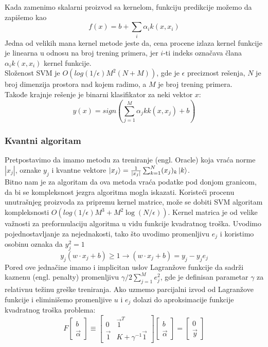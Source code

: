 \documentclass[12pt, letterpaper, oneside]{article}
\begin{document}
Kada zamenimo skalarni proizvod sa kernelom, funkciju predikcije možemo da zapišemo kao
\[
    f(x) = b + \sum_i \alpha_{i}k(x,x_i)
\]
Jedna od velikih mana kernel metode jeste da, cena procene izlaza kernel funkcije je linearna u odnosu na broj trening primera, jer $i$-ti indeks označava člana $\alpha_ik(x,x_i)$ kernel funkcije. \cite{goodfellow2016deep} \\
Složenost SVM je $O(log(1/\epsilon)M^2(N+M))$, gde je $\epsilon$ preciznost rešenja, $N$ je broj dimenzija prostora nad kojem radimo, a $M$ je broj trening primera. \\
Takođe krajnje rešenje je binarni klasifikator za neki vektor $x$:
\[
    y(x) = sign(\sum_{j=1}^{M}\alpha_jkk(x,x_j) + b)
\]

\subsubsection{Kvantni algoritam}
Pretpostavimo da imamo metodu za treniranje (engl. Oracle) koja vraća norme $|x_j|$, oznake $y_j$ i kvantne vektore $\Ket{x_j} = \frac{1}{|x_j|}\sum_{k=1}^{N}(x_j)_k\Ket{k}$. \\
Bitno nam je za algoritam da ova metoda vraća podatke pod donjom granicom, da bi se kompleksnost jezgra algoritma mogla iskazati.
Koristeći procenu unutrašnjeg proizvoda za pripremu kernel matrice, može se dobiti SVM algoritam kompleksnosti $O(log(1/\epsilon)M^3 + M^{2}\log(N/\epsilon))$.
Kernel matrica je od velike važnosti za preformulaciju algoritma u vidu funkcije kvadratnog troška. 
Uvodimo pojednostavljanje za nejednakosti, tako što uvodimo promenljivu $e_j$ i koristimo osobinu oznaka da $y_j^2=1$
\[
    y_{j}(w \cdot x_j + b) \geq 1 \to (w \cdot x_j + b) = y_{j} - y_{j}e_{j}
\]
Pored ove jednačine imamo i implicitan uslov Lagranžove funkcije da sadrži kaznenu (engl. penalty) promenljivu
$\gamma/2\sum_{j=1}^{M}e_j^2$, gde je definisan parametar $\gamma$ za relativnu težinu greške treniranja.
Ako uzmemo parcijalni izvod od Lagranžove funkcije i eliminišemo promenljive $u$ i $e_j$ dolazi do aproksimacije funkcije kvadratnog troška problema:
\[
    F\begin{bmatrix}
        b \\
        \overrightarrow{\alpha}
    \end{bmatrix}
    \equiv \begin{bmatrix}
        0 & \overrightarrow{1}^T \\
        \overrightarrow{1} & K+\gamma^{-1} \overrightarrow{1}
    \end{bmatrix}
    \begin{bmatrix}
        b \\
        \overrightarrow{\alpha}
    \end{bmatrix} =
    \begin{bmatrix}
        0 \\
        \overrightarrow{y}
    \end{bmatrix}
\]
\end{document}
